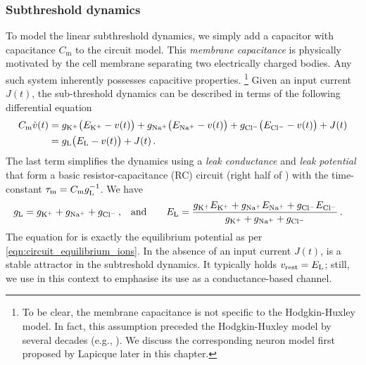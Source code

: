 \subsubsection{Subthreshold dynamics}
To model the linear subthreshold dynamics, we simply add a capacitor with capacitance $C_\mathrm{m}$ to the circuit model.
This \emph{membrane capacitance} is physically motivated by the cell membrane separating two electrically charged bodies.
Any such system inherently possesses capacitive properties.%
\footnote{To be clear, the membrane capacitance is not specific to the Hodgkin-Huxley model. In fact, this assumption preceded the Hodgkin-Huxley model by several decades (e.g., \cite{lapicque1907recherches}). We discuss the corresponding \LIF neuron model first proposed by Lapicque later in this chapter.}
Given an input current $J(t)$, the sub-threshold dynamics can be described in terms of the following differential equation
\begin{align}
	\begin{aligned}
	C_\mathrm{m} \dot{{v}}(t) &=
		  g_\mathrm{K^+} \bigl(E_\mathrm{K^+} - {v}(t)\bigr)
		+ g_\mathrm{Na^+} \bigl(E_\mathrm{Na^+} - {v}(t)\bigr)
		+ g_\mathrm{Cl^-} \bigl(E_\mathrm{Cl^-} - {v}(t)\bigr) + J(t) \\ &=
	g_\mathrm{L} \bigl(E_\mathrm{L} - {v}(t)\bigr) + J(t) \,.
	\end{aligned}
\end{align}
The last term simplifies the dynamics using a \emph{leak conductance} \gL and \emph{leak potential} \EL that form a basic resistor-capacitance (RC) circuit (right half of ) with the time-constant ${\tau_\mathrm{m}} = C_\mathrm{m} g_\mathrm{L}^{-1}$.
We have
\begin{align*}
	g_\mathrm{L} &= g_\mathrm{K^+} + g_\mathrm{Na^+} + g_\mathrm{Cl^-} \,, &
	\text{and} \quad \quad E_\mathrm{L} &= \frac{g_\mathrm{K^+} E_\mathrm{K^+} +
				 	g_\mathrm{Na^+} E_\mathrm{Na^+} + g_\mathrm{Cl^-} E_\mathrm{Cl^-}}{g_\mathrm{K^+} + g_\mathrm{Na^+} + g_\mathrm{Cl^-}} \,.
\end{align*}
The equation for \EL is exactly the equilibrium potential as per \cref{eqn:circuit_equilibrium_ions}.
In the absence of an input current $J(t)$, \EL is a stable attractor in the subtreshold dynamics.
It typically holds $v_\mathrm{rest} = E_\mathrm{L}$; still, we use \EL in this context to emphasise its use as a conductance-based channel.

